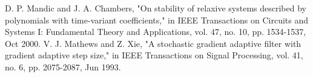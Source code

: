 \documentclass{article}
\begin{document}
\begin{thebibliography}{}
D. P. Mandic and J. A. Chambers, "On stability of relaxive systems described by polynomials with time-variant coefficients," in IEEE Transactions on Circuits and Systems I: Fundamental Theory and Applications, vol. 47, no. 10, pp. 1534-1537, Oct 2000.
V. J. Mathews and Z. Xie, "A stochastic gradient adaptive filter with gradient adaptive step size," in IEEE Transactions on Signal Processing, vol. 41, no. 6, pp. 2075-2087, Jun 1993.
\end{thebibliography}
\end{document}
